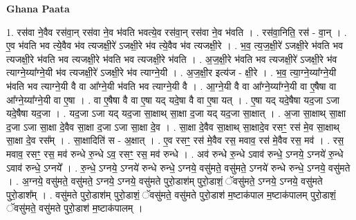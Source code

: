 \documentclass[17pt]{extarticle}
\begin{document}
\textbf{Ghana Paata } \newline

1. रस॑वा ने॒वैव रस॑वा॒न् रस॑वा ने॒व भ॑वति भवत्ये॒व रस॑वा॒न् रस॑वा ने॒व भ॑वति । . रस॑वा॒निति॒ रस॑ - वा॒न् । . ए॒व भ॑वति भव त्ये॒वैव भ॑व त्यजक्षी॒रे॑ ऽजक्षी॒रे भ॑व त्ये॒वैव भ॑व त्यजक्षी॒रे । . भ॒व॒ त्य॒ज॒क्षी॒रे॑ ऽजक्षी॒रे भ॑वति भव त्यजक्षी॒रे भ॑वति भव त्यजक्षी॒रे भ॑वति भव त्यजक्षी॒रे भ॑वति । . अ॒ज॒क्षी॒रे भ॑वति भव त्यजक्षी॒रे॑ ऽजक्षी॒रे भ॑व त्याग्ने॒य्या᳚ग्ने॒यी भ॑व त्यजक्षी॒रे॑ ऽजक्षी॒रे भ॑व त्याग्ने॒यी । . अ॒ज॒क्षी॒र इत्य॑ज - क्षी॒रे । . भ॒व॒ त्या॒ग्ने॒य्या᳚ग्ने॒यी भ॑वति भव त्याग्ने॒यी वै वा आ᳚ग्ने॒यी भ॑वति भव त्याग्ने॒यी वै । . आ॒ग्ने॒यी वै वा आ᳚ग्ने॒य्या᳚ग्ने॒यी वा ए॒षैषा वा आ᳚ग्ने॒य्या᳚ग्ने॒यी वा ए॒षा । . वा ए॒षैषा वै वा ए॒षा यद् यदे॒षा वै वा ए॒षा यत् । . ए॒षा यद् यदे॒षैषा यद॒जा ऽजा यदे॒षैषा यद॒जा । . यद॒जा ऽजा यद् यद॒जा सा॒क्षाथ् सा॒क्षा द॒जा यद् यद॒जा सा॒क्षात् । . अ॒जा सा॒क्षाथ् सा॒क्षा द॒जा ऽजा सा॒क्षा दे॒वैव सा॒क्षा द॒जा ऽजा सा॒क्षा दे॒व । . सा॒क्षा दे॒वैव सा॒क्षाथ् सा॒क्षादे॒व रसꣳ॒॒ रस॑ मे॒व सा॒क्षाथ् सा॒क्षा दे॒व रस᳚म् । . सा॒क्षादिति॑ स - अ॒क्षात् । . ए॒व रसꣳ॒॒ रस॑ मे॒वैव रस॒ मवाव॒ रस॑ मे॒वैव रस॒ मव॑ । . रस॒ मवाव॒ रसꣳ॒॒ रस॒ मव॑ रुन्धे रु॒न्धे ऽव॒ रसꣳ॒॒ रस॒ मव॑ रुन्धे । . अव॑ रुन्धे रु॒न्धे ऽवाव॑ रुन्धे॒ ऽग्नये॒ ऽग्नये॑ रु॒न्धे ऽवाव॑ रुन्धे॒ ऽग्नये᳚ । . रु॒न्धे॒ ऽग्नये॒ ऽग्नये॑ रुन्धे रुन्धे॒ ऽग्नये॒ वसु॑मते॒ वसु॑मते॒ ऽग्नये॑ रुन्धे रुन्धे॒ ऽग्नये॒ वसु॑मते । . अ॒ग्नये॒ वसु॑मते॒ वसु॑मते॒ ऽग्नये॒ ऽग्नये॒ वसु॑मते पुरो॒डाश॑म् पुरो॒डाशं॒ ॅवसु॑मते॒ ऽग्नये॒ ऽग्नये॒ वसु॑मते पुरो॒डाश᳚म् । . वसु॑मते पुरो॒डाश॑म् पुरो॒डाशं॒ ॅवसु॑मते॒ वसु॑मते पुरो॒डाश॑ म॒ष्टाक॑पाल म॒ष्टाक॑पालम् पुरो॒डाशं॒ ॅवसु॑मते॒ वसु॑मते पुरो॒डाश॑ म॒ष्टाक॑पालम् । \newline
\end{document}
